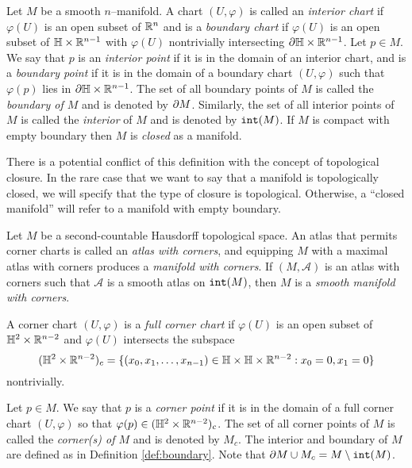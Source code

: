 \begin{defn}[Boundary]
	\label{def:boundary}
	Let $M$ be a smooth $n$--manifold.
	A chart $(U,\varphi)$ is called an \emph{interior chart} if $\varphi(U)$ is an open subset of $\mathbb{R}^n$ and is a \emph{boundary chart} if $\varphi(U)$ is an open subset of $\mathbb{H}\times\mathbb{R}^{n-1}$ with $\varphi(U)$ nontrivially intersecting $\partial \mathbb{H}\times\mathbb{R}^{n-1}$.
	Let $p\in M$.
	We say that $p$ is an \emph{interior point} if it is in the domain of an interior chart, and is a \emph{boundary point} if it is in the domain of a boundary chart $(U,\varphi)$ such that $\varphi(p)$ lies in $\partial\mathbb{H}\times\mathbb{R}^{n-1}$.
	The set of all boundary points of $M$ is called the \emph{boundary of $M$} and is denoted by $\partial M$.
	Similarly, the set of all interior points of $M$ is called the \emph{interior} of $M$ and is denoted by $\mathtt{int}(M)$.
	If $M$ is compact with empty boundary then $M$ is \emph{closed} as a manifold.
\end{defn}

There is a potential conflict of this definition with the concept of topological closure.
In the rare case that we want to say that a manifold is topologically closed, we will specify that the type of closure is topological.
Otherwise, a ``closed manifold'' will refer to a manifold with empty boundary.

\begin{defn}
	Let $M$ be a second-countable Hausdorff topological space.
	An atlas that permits corner charts is called an \emph{atlas with corners}, and equipping $M$ with a maximal atlas with corners produces a \emph{manifold with corners}.
	If $(M,\mathcal{A})$ is an atlas with corners such that $\mathcal{A}$ is a smooth atlas on $\mathtt{int}(M)$, then $M$ is a \emph{smooth manifold with corners}.
	
	A corner chart $(U,\varphi)$ is a \emph{full corner chart} if $\varphi(U)$ is an open subset of $\mathbb{H}^2\times\mathbb{R}^{n-2}$ and $\varphi(U)$ intersects the subspace 
	\[
		(\mathbb{H}^2\times\mathbb{R}^{n-2})_c = \{(x_0,x_1,\dots,x_{n-1})\in\mathbb{H}\times\mathbb{H}\times\mathbb{R}^{n-2}:x_0=0,x_1=0\}
	\]
	nontrivially.
	
	Let $p\in M$.
	We say that $p$ is a \emph{corner point} if it is in the domain of a full corner chart $(U,\varphi)$ so that $\varphi(p)\in(\mathbb{H}^2\times\mathbb{R}^{n-2})_c$.
	The set of all corner points of $M$ is called the \emph{corner(s) of $M$} and is denoted by $M_c$.
	The interior and boundary of $M$ are defined as in Definition \ref{def:boundary}.
	Note that $\partial M\cup M_c=M\setminus\mathtt{int}(M)$.
\end{defn}

